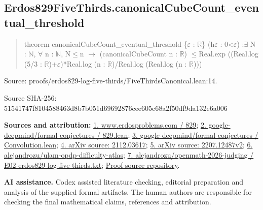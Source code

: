 \documentclass[11pt,a4paper]{article}
\begin{document}
\begin{samepage}
\subsection{Erdos829FiveThirds.canonicalCubeCount\_eventual\_threshold}
\begin{quote}\small\ttfamily theorem canonicalCubeCount\_eventual\_threshold \{\ensuremath{\varepsilon} : \ensuremath{\mathbb{R}}\} (h\ensuremath{\varepsilon} : 0<\ensuremath{\varepsilon}) :\newline     \ensuremath{\exists} N : \ensuremath{\mathbb{N}}, \ensuremath{\forall} n : \ensuremath{\mathbb{N}}, N\ensuremath{\leq}n \ensuremath{\to} (canonicalCubeCount n : \ensuremath{\mathbb{R}}) \ensuremath{\leq}\newline       Real.exp ((Real.log (5/3 : \ensuremath{\mathbb{R}})+\ensuremath{\varepsilon})*Real.log (n : \ensuremath{\mathbb{R}})/Real.log (Real.log (n : \ensuremath{\mathbb{R}})))\end{quote}
{\small Source: proofs/erdos829-log-five-thirds/FiveThirdsCanonical.lean:14.\par}

{\small Source SHA-256: 51541747f8104588463d8b7b051d69692876cee605c68a2f50df9da132e6a006\par}

{\small\textbf{Sources and attribution:} \href{https://www.erdosproblems.com/829}{1. www.erdosproblems.com / 829}; \href{https://github.com/google-deepmind/formal-conjectures/blob/main/FormalConjectures/ErdosProblems/829.lean}{2. google-deepmind/formal-conjectures / 829.lean}; \href{https://github.com/google-deepmind/formal-conjectures/blob/main/FormalConjecturesForMathlib/Combinatorics/Additive/Convolution.lean}{3. google-deepmind/formal-conjectures / Convolution.lean}; \href{https://arxiv.org/html/2112.03617}{4. arXiv source: 2112.03617}; \href{https://arxiv.org/html/2207.12487v2}{5. arXiv source: 2207.12487v2}; \href{https://github.com/alejandrozu/ulam-opdp-difficulty-atlas}{6. alejandrozu/ulam-opdp-difficulty-atlas}; \href{https://github.com/alejandrozu/openmath-2026-judging/blob/d0ed487f487fa7ec814ff705ab55249983fe8707/OpenMath-Judging/review/entries/E02-erdos829-log-five-thirds.txt}{7. alejandrozu/openmath-2026-judging / E02-erdos829-log-five-thirds.txt}; \href{https://github.com/alejandrozu/openmath-2026-judging}{Proof source repository}.\par}

\end{samepage}
{\small \textbf{AI assistance.} Codex assisted literature checking, editorial preparation and analysis of the supplied formal artifacts. The human authors are responsible for checking the final mathematical claims, references and attribution.\par}
\end{document}
